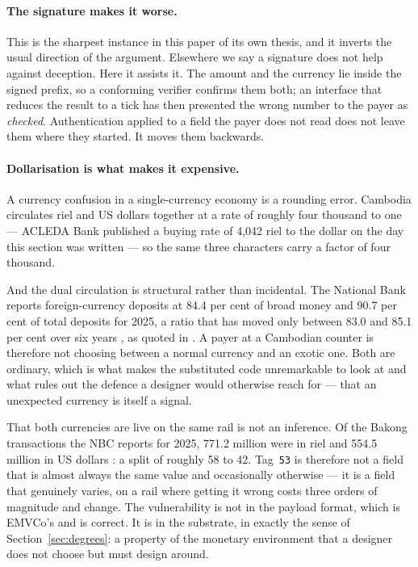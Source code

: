 \documentclass[10pt,a4paper,twocolumn]{article}
\begin{document}
\paragraph{The signature makes it worse.} This is the sharpest instance in this
paper of its own thesis, and it inverts the usual direction of the argument.
Elsewhere we say a signature does not help against deception. Here it assists
it. The amount and the currency lie inside the signed prefix, so a conforming
verifier confirms them both; an interface that reduces the result to a tick has
then presented the wrong number to the payer as \emph{checked}. Authentication
applied to a field the payer does not read does not leave them where they
started. It moves them backwards.

\paragraph{Dollarisation is what makes it expensive.} A currency confusion in a
single-currency economy is a rounding error. Cambodia circulates riel and US
dollars together at a rate of roughly four thousand to one --- ACLEDA Bank
published a buying rate of 4{,}042 riel to the dollar on the day this section was
written \citep{acleda2026tips} --- so the same three characters carry a factor of
four thousand.

And the dual circulation is structural rather than incidental. The National Bank
reports foreign-currency deposits at 84.4 per cent of broad money and 90.7 per
cent of total deposits for 2025, a ratio that has moved only between 83.0 and
85.1 per cent over six years \citep{nbcfsr2025}, as quoted in
\citet{chay2026stages}. A payer at a Cambodian
counter is therefore not choosing between a normal currency and an exotic one.
Both are ordinary, which is what makes the substituted code unremarkable to look
at and what rules out the defence a designer would otherwise reach for --- that
an unexpected currency is itself a signal.

That both currencies are live on the same rail is not an inference. Of the
Bakong transactions the NBC reports for 2025, 771.2 million were in riel and
554.5 million in US dollars \citep{nbc2025annual}: a split of roughly 58 to 42.
Tag~\texttt{53} is therefore not a field that is almost always the same value
and occasionally otherwise --- it is a field that genuinely varies, on a rail
where getting it wrong costs three orders of magnitude and change. The vulnerability is not in the payload format, which is EMVCo's
and is correct. It is in the substrate, in exactly the sense of
Section~\ref{sec:degrees}: a property of the monetary environment that a
designer does not choose but must design around.
\end{document}

